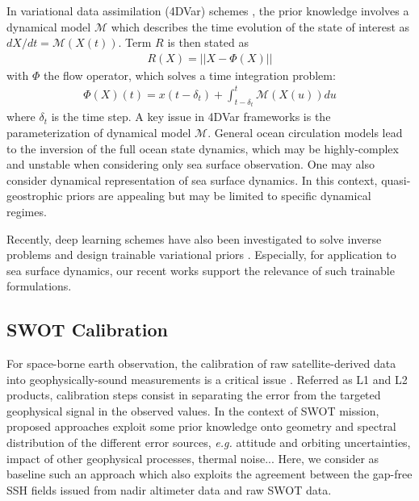 \documentclass{article}
\begin{document}
In variational data assimilation (4DVar) schemes \cite{blum2009data}, the prior knowledge involves a dynamical model $\mathcal{M}$ which describes the time evolution of the state of interest as $dX/dt=\mathcal{M}(X(t))$. Term $R$ is then stated as
%
\begin{align}
	\label{eqn:4dprior}
	R(X) = ||X - \Phi(X)||
\end{align}
%
with $\Phi$ the flow operator, which solves a time integration problem:
%
\begin{align}
	\label{eqn:phi}
\Phi(X)(t) = x(t-\delta_t) + \int_{t-\delta_t}^t\mathcal{M}(X(u))du
\end{align}
%
where $\delta_t$ is the time step. A key issue in 4DVar frameworks is the parameterization of dynamical model $\mathcal{M}$. General ocean circulation models \cite{le2018ocean} lead to the inversion of the full ocean state dynamics, which may be highly-complex and unstable when considering only sea surface observation. One may also consider dynamical representation of sea surface dynamics. In this context, quasi-geostrophic priors \cite{dyninterp}\cite{bfn} are appealing but may be limited to specific dynamical regimes.  

Recently, deep learning schemes have also been investigated to solve inverse problems and design trainable variational priors \cite{lucas2018using}\cite{Mack_2020}\cite{Brajard_2020}. Especially, for application to sea surface dynamics, our recent works  \cite{benaichouche:hal-03139066,joint4dvar, e2e4dvar} support the relevance of such trainable formulations. 


\subsection{SWOT Calibration}

For space-borne earth observation, the calibration of raw satellite-derived data into geophysically-sound 
measurements is a critical issue \cite{ceoshandbook}. Referred as L1 and L2 products, calibration steps consist in separating the error from the targeted geophysical signal in the observed values. In the context of SWOT mission, proposed approaches exploit some prior knowledge onto geometry and spectral distribution of the different error sources\cite{clemcalib}\cite{swotcalib}, {\em e.g.} attitude and orbiting  uncertainties, impact of other geophysical processes, thermal noise... Here, we consider as baseline such an approach which also exploits the agreement between the gap-free SSH fields issued from nadir altimeter data and raw SWOT data.
\end{document}
